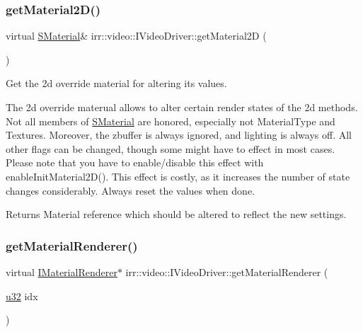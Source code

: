 \subsubsection{\texorpdfstring{get\+Material2\+D()}{getMaterial2D()}}
{\footnotesize\ttfamily virtual \hyperlink{classirr_1_1video_1_1SMaterial}{S\+Material}\& irr\+::video\+::\+I\+Video\+Driver\+::get\+Material2D (\begin{DoxyParamCaption}{ }\end{DoxyParamCaption})\hspace{0.3cm}{\ttfamily [pure virtual]}}



Get the 2d override material for altering its values. 

The 2d override materual allows to alter certain render states of the 2d methods. Not all members of \hyperlink{classirr_1_1video_1_1SMaterial}{S\+Material} are honored, especially not Material\+Type and Textures. Moreover, the zbuffer is always ignored, and lighting is always off. All other flags can be changed, though some might have to effect in most cases. Please note that you have to enable/disable this effect with enable\+Init\+Material2\+D(). This effect is costly, as it increases the number of state changes considerably. Always reset the values when done. \begin{DoxyReturn}{Returns}
Material reference which should be altered to reflect the new settings. 
\end{DoxyReturn}
\mbox{\label{classirr_1_1video_1_1IVideoDriver_accb321dfb32ad3c76efb99427bc90cc8}} 
\subsubsection{\texorpdfstring{get\+Material\+Renderer()}{getMaterialRenderer()}}
{\footnotesize\ttfamily virtual \hyperlink{classirr_1_1video_1_1IMaterialRenderer}{I\+Material\+Renderer}$\ast$ irr\+::video\+::\+I\+Video\+Driver\+::get\+Material\+Renderer (\begin{DoxyParamCaption}\item[{\hyperlink{namespaceirr_a0416a53257075833e7002efd0a18e804}{u32}}]{idx }\end{DoxyParamCaption})\hspace{0.3cm}{\ttfamily [pure virtual]}}



